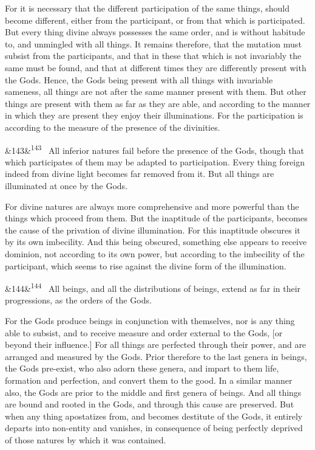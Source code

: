 \documentclass[12pt]{article}
\newcommand{\para}[1][]{\par\noindent\ifx&#1&\else\textsuperscript{\footnotesize #1}~\fi}
\begin{document}
For it is necessary that the different participation of the same things, should become different, either from the participant, or from that which is participated. But every thing divine always possesses the same order, and is without habitude to, and unmingled with all things. It remains therefore, that the mutation must subsist from the participants, and that in these that which is not invariably the same must be found, and that at different times they are differently present with the Gods. Hence, the Gods being present with all things with invariable sameness, all things are not after the same manner present with them. But other things are present with them as far as they are able, and according to the manner in which they are present they enjoy their illuminations. For the participation is according to the measure of the presence of the divinities.

\para[143] All inferior natures fail before the presence of the Gods, though that which participates of them may be adapted to participation. Every thing foreign indeed from divine light becomes far removed from it. But all things are illuminated at once by the Gods.

For divine natures are always more comprehensive and more powerful than the things which proceed from them. But the inaptitude of the participants, becomes the cause of the privation of divine illumination. For this inaptitude obscures it by its own imbecility. And this being obscured, something else appears to receive dominion, not according to its own power, but according to the imbecility of the participant, which seems to rise against the divine form of the illumination.

\para[144] All beings, and all the distributions of beings, extend as far in their progressions, as the orders of the Gods.

For the Gods produce beings in conjunction with themselves, nor is any thing able to subsist, and to receive measure and order external to the Gods, [or beyond their influence.] For all things are perfected through their power, and are arranged and measured by the Gods. Prior therefore to the last genera in beings, the Gods pre-exist, who also adorn these genera, and impart to them life, formation and perfection, and convert them to the good. In a similar manner also, the Gods are prior to the middle and first genera of beings. And all things are bound and rooted in the Gods, and through this cause are preserved. But when any thing apostatizes from, and becomes destitute of the Gods, it entirely departs into non-entity and vanishes, in consequence of being perfectly deprived of those natures by which it was contained.
\end{document}
